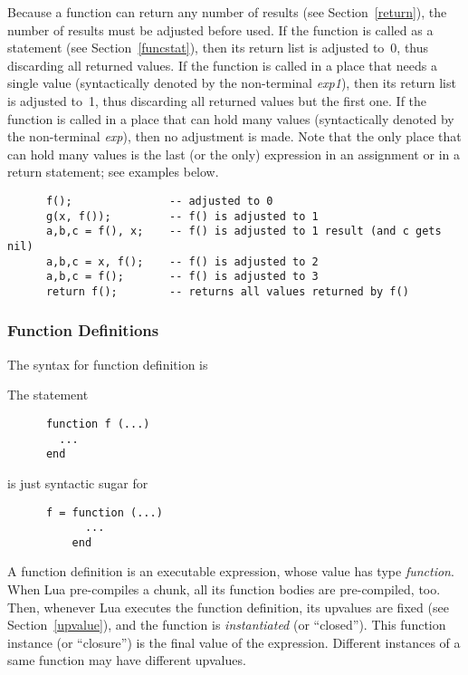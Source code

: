 \documentclass[11pt]{article}
\newcommand{\See}[1]{Section~\ref{#1}}
\newcommand{\see}[1]{(see \See{#1})}
\newcommand{\M}[1]{\emph{#1}}
\newcommand{\Index}[1]{#1\index{#1}}
\begin{document}
Because a function can return any number of results
\see{return},
the number of results must be adjusted before used.
If the function is called as a statement \see{funcstat},
then its return list is adjusted to~0,
thus discarding all returned values.
If the function is called in a place that needs a single value
(syntactically denoted by the non-terminal \M{exp1}),
then its return list is adjusted to~1,
thus discarding all returned values but the first one.
If the function is called in a place that can hold many values
(syntactically denoted by the non-terminal \M{exp}),
then no adjustment is made.
Note that the only place that can hold many values
is the last (or the only) expression in an assignment
or in a return statement; see examples below.
\begin{verbatim}
      f();               -- adjusted to 0
      g(x, f());         -- f() is adjusted to 1
      a,b,c = f(), x;    -- f() is adjusted to 1 result (and c gets nil)
      a,b,c = x, f();    -- f() is adjusted to 2
      a,b,c = f();       -- f() is adjusted to 3
      return f();        -- returns all values returned by f()
\end{verbatim}

\subsubsection{\Index{Function Definitions}} \label{func-def}

The syntax for function definition is
\begin{Produc}
\end{Produc}
The statement
\begin{verbatim}
      function f (...)
        ...
      end
\end{verbatim}
is just syntactic sugar for
\begin{verbatim}
      f = function (...)
            ...
          end
\end{verbatim}

A function definition is an executable expression,
whose value has type \emph{function}.
When Lua pre-compiles a chunk,
all its function bodies are pre-compiled, too.
Then, whenever Lua executes the function definition,
its upvalues are fixed \see{upvalue},
and the function is \emph{instantiated} (or ``closed'').
This function instance (or ``closure'')
is the final value of the expression.
Different instances of a same function
may have different upvalues.
\end{document}
